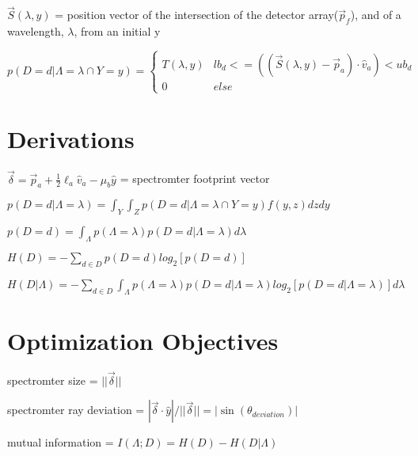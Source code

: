 \documentclass{article}
\begin{document}
$\vec{S}(\lambda, y)$ = position vector of the intersection of the detector array($\vec{p}_f$), and of a wavelength, $\lambda$, from an initial y

\[p(D=d|\Lambda=\lambda \cap Y=y) = \begin{cases}
		T(\lambda, y) & lb_d <= ((\vec{S}(\lambda, y) - \vec{p}_a) \cdot \hat{v}_a) < ub_d \\
		0             & else
	\end{cases}\]

\section{Derivations}\label{sec:derivations}

$\vec{\delta} = \vec{p}_a + \frac{1}{2} \ell_a \hat{v}_a - \mu_b \hat{y}$ = spectromter footprint vector

$p(D=d|\Lambda=\lambda) = \int_Y\int_Z p(D=d|\Lambda=\lambda \cap Y=y)f(y, z)dz dy$

$p(D=d) = \int_\Lambda p(\Lambda=\lambda) p(D=d|\Lambda=\lambda)d\lambda$

$H(D) = -\sum_{d \in D}p(D=d) log_2[p(D=d)]$

$H(D|\Lambda) = -\sum_{d \in D}\int_{\Lambda}p(\Lambda=\lambda) p(D=d|\Lambda=\lambda) log_2[p(D=d|\Lambda=\lambda)] d\lambda$

\section{Optimization Objectives}\label{sec:optimization-objectives}

spectromter size = $||\vec{\delta}||$

spectromter ray deviation = $| \vec{\delta} \cdot \hat{y} | / ||\vec{\delta}|| = | \sin(\theta_{deviation}) | $

mutual information = $I(\Lambda; D) = H(D) - H(D|\Lambda)$
\end{document}
